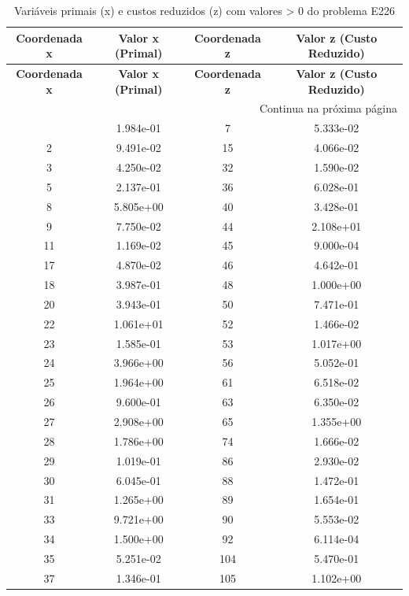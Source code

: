 \documentclass[12pt]{article}
\begin{document}
\begin{longtable}{@{}cccc@{}}
\caption{Variáveis primais (x) e custos reduzidos (z) com valores > 0 do problema E226} \\
\toprule
\textbf{Coordenada x} & \textbf{Valor x (Primal)} & \textbf{Coordenada z} & \textbf{Valor z (Custo Reduzido)} \\
\midrule
\endfirsthead

\toprule
\textbf{Coordenada x} & \textbf{Valor x (Primal)} & \textbf{Coordenada z} & \textbf{Valor z (Custo Reduzido)} \\
\midrule
\endhead

\midrule \multicolumn{4}{r}{{Continua na próxima página}} \\ \midrule
\endfoot

\bottomrule
\endlastfoot
1 & 1.984e-01 & 7 & 5.333e-02 \\
2 & 9.491e-02 & 15 & 4.066e-02 \\
3 & 4.250e-02 & 32 & 1.590e-02 \\
5 & 2.137e-01 & 36 & 6.028e-01 \\
8 & 5.805e+00 & 40 & 3.428e-01 \\
9 & 7.750e-02 & 44 & 2.108e+01 \\
11 & 1.169e-02 & 45 & 9.000e-04 \\
17 & 4.870e-02 & 46 & 4.642e-01 \\
18 & 3.987e-01 & 48 & 1.000e+00 \\
20 & 3.943e-01 & 50 & 7.471e-01 \\
22 & 1.061e+01 & 52 & 1.466e-02 \\
23 & 1.585e-01 & 53 & 1.017e+00 \\
24 & 3.966e+00 & 56 & 5.052e-01 \\
25 & 1.964e+00 & 61 & 6.518e-02 \\
26 & 9.600e-01 & 63 & 6.350e-02 \\
27 & 2.908e+00 & 65 & 1.355e+00 \\
28 & 1.786e+00 & 74 & 1.666e-02 \\
29 & 1.019e-01 & 86 & 2.930e-02 \\
30 & 6.045e-01 & 88 & 1.472e-01 \\
31 & 1.265e+00 & 89 & 1.654e-01 \\
33 & 9.721e+00 & 90 & 5.553e-02 \\
34 & 1.500e+00 & 92 & 6.114e-04 \\
35 & 5.251e-02 & 104 & 5.470e-01 \\
37 & 1.346e-01 & 105 & 1.102e+00 \\

\end{longtable}
\end{document}
